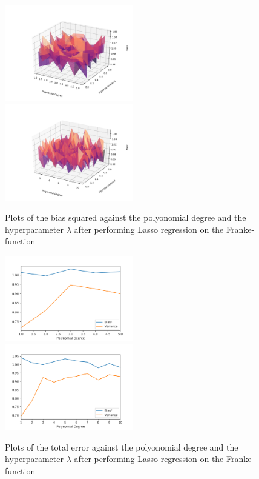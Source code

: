 \documentclass[a4paper,10pt,english]{article}
\begin{document}
\begin{figure}[H]
	\centering 
	\includegraphics[width = 0.5\textwidth, center]{../franke_output/part_E_4.png}
	\includegraphics[width = 0.5\textwidth, center]{../franke_output/part_E_4_highdeg.png}
	\caption{
		Plots of the bias squared against the polyonomial degree and the hyperparameter $\lambda$ after performing Lasso regression on the Franke-function 
	}
	\label{part_e4}
\end{figure}

\begin{figure}[H]
	\centering 
	\includegraphics[width = 0.5\textwidth, center]{../franke_output/part_E_5.png}
	\includegraphics[width = 0.5\textwidth, center]{../franke_output/part_E_5_highdeg.png}
	\caption{
		Plots of the total error against the polyonomial degree and the hyperparameter $\lambda$ after performing Lasso regression on the Franke-function 
	}
	\label{part_e5}
\end{figure}
\end{document}
